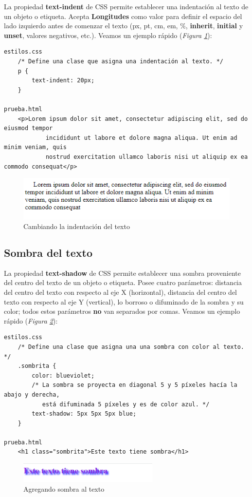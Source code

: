 La propiedad \textbf{text-indent} de CSS permite establecer una indentación al texto de un objeto o etiqueta. Acepta \textbf{Longitudes} como valor para definir el espacio del lado izquierdo antes de comenzar el texto (px, pt, cm, em, \%, \textbf{inherit}, \textbf{initial} y \textbf{unset}, valores negativos, etc.). Veamos un ejemplo rápido (\textit{Figura \ref{fig: 13}}):
\begin{lstlisting}
estilos.css
    /* Define una clase que asigna una indentación al texto. */
    p {
        text-indent: 20px;
    }
    
prueba.html
    <p>Lorem ipsum dolor sit amet, consectetur adipiscing elit, sed do eiusmod tempor 
            incididunt ut labore et dolore magna aliqua. Ut enim ad minim veniam, quis 
            nostrud exercitation ullamco laboris nisi ut aliquip ex ea commodo consequat</p>
\end{lstlisting}
\begin{figure}[H]
    \centering
    \caption{Cambiando la indentación del texto}
    \label{fig: 13}
    \includegraphics[width=12cm]{ss/fuentes-indent.png}
\end{figure}


\subsection{Sombra del texto}

La propiedad \textbf{text-shadow} de CSS permite establecer una sombra proveniente del centro del texto de un objeto o etiqueta. Posee cuatro parámetros: distancia del centro del texto con respecto al eje X (horizontal), distancia del centro del texto con respecto al eje Y (vertical), lo borroso o difuminado de la sombra y su color; todos estos parámetros \textbf{no} van separados por comas. Veamos un ejemplo rápido (\textit{Figura \ref{fig: 14}}):
\begin{lstlisting}
estilos.css
    /* Define una clase que asigna una una sombra con color al texto. */
    .sombrita {
        color: blueviolet;
        /* La sombra se proyecta en diagonal 5 y 5 píxeles hacía la abajo y derecha,
           está difuminada 5 píxeles y es de color azul. */
        text-shadow: 5px 5px 5px blue;
    }
    
prueba.html
    <h1 class="sombrita">Este texto tiene sombra</h1>
\end{lstlisting}
\begin{figure}[H]
    \centering
    \caption{Agregando sombra al texto}
    \label{fig: 14}
    \includegraphics[width=7cm]{ss/fuentes-shadow.png}
\end{figure}

